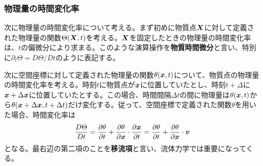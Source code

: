 \documentclass[dvipdfmx, 9pt, a4paper]{jsarticle}
\numberwithin{equation}{section}
\newcommand{\bm}[1]{{\mbox{\boldmath $#1$}}}
\begin{document}
\subsubsection{物理量の時間変化率}
次に物理量の時間変化率について考える。まず初めに物質点$\bm X$に対して定義された物理量の関数$\Theta(\bm X, t)$を考える。$\bm X$を固定したときの物理量の時間変化率は、$t$の偏微分により求まる。このような演算操作を{\bf 物質時間微分}と言い、特別に$\partial_t\Theta=D\Theta/Dt$のように表記する。\par
次に空間座標に対して定義された物理量の関数$\theta(\bm x, t)$について、物質点の物理量の時間変化率を考える。時刻$t$に物質点が$\bm x$に位置していたとし、時刻$t+\Delta$に$\bm x+\Delta \bm x$に位置していたとする。この場合、時間間隔$\Delta t$の間に物理量は$\theta(\bm x, t)$から$\theta(\bm x+\Delta \bm x, t+\Delta t)$だけ変化する。従って、空間座標で定義された関数$\theta$を用いた場合、時間変化率は
\begin{equation}
\frac{D\Theta}{Dt}=\frac{\partial \theta}{\partial t}+\frac{\partial \theta}{\partial \bm x}\cdot \frac{\partial \bm x}{\partial t}=\frac{\partial \theta}{\partial t}+\frac{\partial \theta}{\partial \bm x}\cdot \bm v
\end{equation}
となる。最右辺の第二項のことを{\bf 移流項}と言い、流体力学では重要になってくる。
\end{document}
